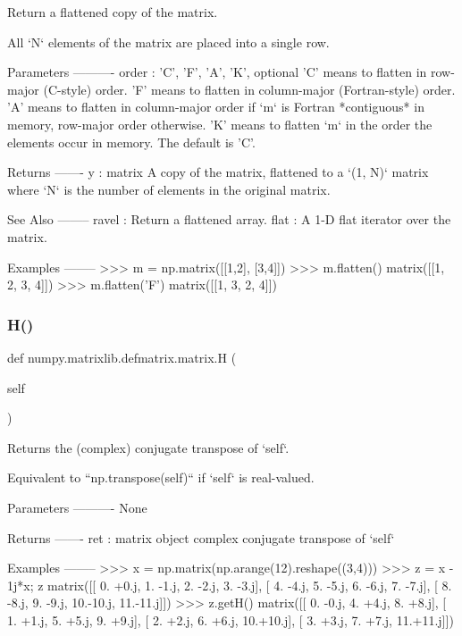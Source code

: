 \begin{DoxyVerb}Return a flattened copy of the matrix.

All `N` elements of the matrix are placed into a single row.

Parameters
----------
order : {'C', 'F', 'A', 'K'}, optional
    'C' means to flatten in row-major (C-style) order. 'F' means to
    flatten in column-major (Fortran-style) order. 'A' means to
    flatten in column-major order if `m` is Fortran *contiguous* in
    memory, row-major order otherwise. 'K' means to flatten `m` in
    the order the elements occur in memory. The default is 'C'.

Returns
-------
y : matrix
    A copy of the matrix, flattened to a `(1, N)` matrix where `N`
    is the number of elements in the original matrix.

See Also
--------
ravel : Return a flattened array.
flat : A 1-D flat iterator over the matrix.

Examples
--------
>>> m = np.matrix([[1,2], [3,4]])
>>> m.flatten()
matrix([[1, 2, 3, 4]])
>>> m.flatten('F')
matrix([[1, 3, 2, 4]])\end{DoxyVerb}
 \mbox{\label{classnumpy_1_1matrixlib_1_1defmatrix_1_1matrix_a54bbfef0f755718648e885537a9b998f}} 
\subsubsection{\texorpdfstring{H()}{H()}}
{\footnotesize\ttfamily def numpy.\+matrixlib.\+defmatrix.\+matrix.\+H (\begin{DoxyParamCaption}\item[{}]{self }\end{DoxyParamCaption})}

\begin{DoxyVerb}Returns the (complex) conjugate transpose of `self`.

Equivalent to ``np.transpose(self)`` if `self` is real-valued.

Parameters
----------
None

Returns
-------
ret : matrix object
    complex conjugate transpose of `self`

Examples
--------
>>> x = np.matrix(np.arange(12).reshape((3,4)))
>>> z = x - 1j*x; z
matrix([[  0. +0.j,   1. -1.j,   2. -2.j,   3. -3.j],
[  4. -4.j,   5. -5.j,   6. -6.j,   7. -7.j],
[  8. -8.j,   9. -9.j,  10.-10.j,  11.-11.j]])
>>> z.getH()
matrix([[ 0. -0.j,  4. +4.j,  8. +8.j],
[ 1. +1.j,  5. +5.j,  9. +9.j],
[ 2. +2.j,  6. +6.j, 10.+10.j],
[ 3. +3.j,  7. +7.j, 11.+11.j]])\end{DoxyVerb}
 \mbox{\label{classnumpy_1_1matrixlib_1_1defmatrix_1_1matrix_a18a1351ce035e744ab1f9e4ad5917424}} 
